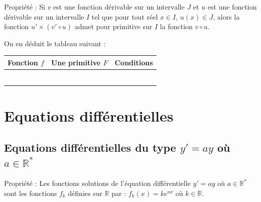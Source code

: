 \documentclass[11pt,a4paper]{article}
\begin{document}
\begin{boiteProp}{Propriété :}
    Si $v$ est une fonction dérivable sur un intervalle $J$ et $u$ est une fonction dérivable sur un intervalle $I$ tel que pour tout réel $x \in I$, $u(x) \in J$, alors la fonction $u' \times (v' \circ u)$ admet pour primitive sur $I$ la fonction $v \circ u$.
\end{boiteProp}

On en déduit le tableau suivant :
\newline

\begin{tabular}{|C{4cm}|C{7cm}|C{4cm}|}
\hline
\textbf{Fonction $f$} 
& \textbf{Une primitive $F$} 
& \textbf{Conditions} \\
\hline
{}
& 
&  \\
\color{black}{}
& \color{black}{}
& \color{black}{Pour $n < -1$,\, u(x) $\neq 0$ pour tout $x \in I$} \\
\hline
{}
& 
& \color{black}{$u(x) \neq 0$ pour tout $x \in I$} \\
\hline
{}
& 
& \color{black}{Pour tout $x \in I$,\, $u(x) > 0$} \\
\hline
{}
& 
& \color{black}{(aucune condition particulière)} \\
\hline
{}
& \color{black}{$\ln(u)$}
& \color{black}{Pour tout $x \in I$,\, $u(x) > 0$} \\
\hline
\end{tabular}


\section{Equations différentielles}

\subsection{Equations différentielles du type $y' = ay$ où $a \in \mathbb{R^*}$}

\begin{boiteProp}{Propriété :}
    Les fonctions solutions de l'équation différentielle $y' = ay$ où $a \in \mathbb{R^*}$ sont les fonctions $f_k$ définies sur $\mathbb{R}$ par : $f_k(x) = k e^{ax}$ où $k \in \mathbb{R}$.
\end{boiteProp}
\end{document}
